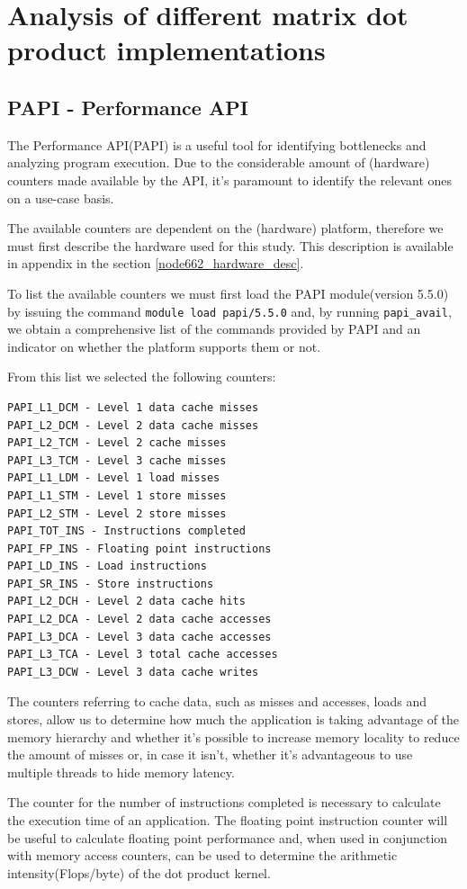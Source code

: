 \documentclass{article}
\begin{document}
\section{Analysis of different matrix dot product implementations}
\subsection{PAPI - Performance API}
The Performance API(PAPI) is a useful tool for identifying bottlenecks and analyzing program execution. Due to the considerable amount of 
(hardware) counters made available by the API, it's paramount to identify the relevant ones on a use-case basis.

The available counters are dependent on the (hardware) platform, therefore we must first describe the hardware used for this study. This description is available in appendix in the section \ref{node662_hardware_desc}.

To list the available counters we must first load the PAPI module(version 5.5.0) by issuing the command \texttt{module load papi/5.5.0} and, 
by running \texttt{papi\_avail}, we obtain a comprehensive list of the commands provided by PAPI and an indicator on whether the platform supports them or not.

From this list we selected the following counters:
\begin{Verbatim}[fontsize=\footnotesize]
PAPI_L1_DCM - Level 1 data cache misses
PAPI_L2_DCM - Level 2 data cache misses
PAPI_L2_TCM - Level 2 cache misses
PAPI_L3_TCM - Level 3 cache misses
PAPI_L1_LDM - Level 1 load misses
PAPI_L1_STM - Level 1 store misses
PAPI_L2_STM - Level 2 store misses
PAPI_TOT_INS - Instructions completed
PAPI_FP_INS - Floating point instructions
PAPI_LD_INS - Load instructions
PAPI_SR_INS - Store instructions
PAPI_L2_DCH - Level 2 data cache hits
PAPI_L2_DCA - Level 2 data cache accesses
PAPI_L3_DCA - Level 3 data cache accesses
PAPI_L3_TCA - Level 3 total cache accesses
PAPI_L3_DCW - Level 3 data cache writes
\end{Verbatim}

The counters referring to cache data, such as misses and accesses, loads and stores, 
allow us to determine how much the application is taking advantage of the memory 
hierarchy and whether it's possible to increase memory locality to reduce the 
amount of misses or, in case it isn't, whether it's advantageous to use multiple threads
to hide memory latency.

The counter for the number of instructions completed is necessary to calculate the 
execution time of an application. 
The floating point instruction counter will be useful to calculate floating point performance and,
when used in conjunction with memory access counters, can be used to determine the 
arithmetic intensity(Flops/byte) of the dot product kernel.
\end{document}
